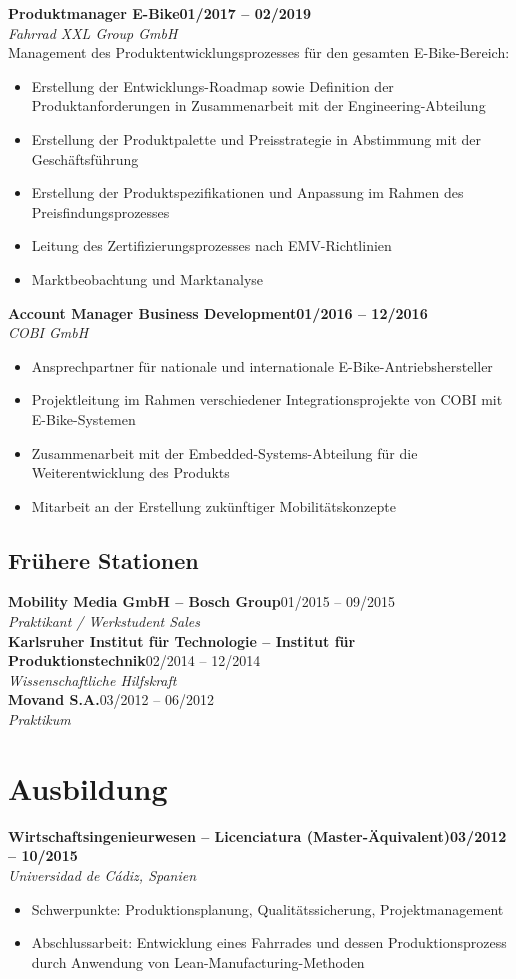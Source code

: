 \documentclass[10.5pt,a4paper]{article}
\newcommand{\cventry}[4]{%
  \needspace{6\baselineskip}%
  \noindent\textbf{\large #2}\hfill{\color{gray}\textbf{\small #1}}\\[1pt]
  {\color{accent}\textit{#3}}\\[3pt]
  #4
  \vspace{5pt}
}
\newcommand{\cvcompact}[3]{%
  \noindent\textbf{#2}\hfill{\color{gray}\small #1}\\[1pt]
  {\small\color{gray}\textit{#3}}\\[4pt]
}
\newcommand{\cvedu}[4]{%
  \needspace{6\baselineskip}%
  \noindent\textbf{\large #2}\hfill{\color{gray}\textbf{\small #1}}\\[1pt]
  {\color{accent}\textit{#3}}\\[3pt]
  #4
  \vspace{7pt}
}
\newenvironment{tightitemize}{
  \begin{itemize}[leftmargin=12pt,itemsep=1pt,topsep=2pt,parsep=0pt,label={\color{accent}\textbullet}]
}{\end{itemize}}
\begin{document}
\cventry{01/2017 -- 02/2019}{Produktmanager E-Bike}{Fahrrad XXL Group GmbH}{
Management des Produktentwicklungsprozesses für den gesamten E-Bike-Bereich:
\begin{tightitemize}
  \item Erstellung der Entwicklungs-Roadmap sowie Definition der Produktanforderungen in Zusammenarbeit mit der Engineering-Abteilung
  \item Erstellung der Produktpalette und Preisstrategie in Abstimmung mit der Geschäftsführung
  \item Erstellung der Produktspezifikationen und Anpassung im Rahmen des Preisfindungsprozesses
  \item Leitung des Zertifizierungsprozesses nach EMV-Richtlinien
  \item Marktbeobachtung und Marktanalyse
\end{tightitemize}
}

\cventry{01/2016 -- 12/2016}{Account Manager Business Development}{COBI GmbH}{
\begin{tightitemize}
  \item Ansprechpartner für nationale und internationale E-Bike-Antriebshersteller
  \item Projektleitung im Rahmen verschiedener Integrationsprojekte von COBI mit E-Bike-Systemen
  \item Zusammenarbeit mit der Embedded-Systems-Abteilung für die Weiterentwicklung des Produkts
  \item Mitarbeit an der Erstellung zukünftiger Mobilitätskonzepte
\end{tightitemize}
}

\subsection*{Frühere Stationen}
\cvcompact{01/2015 -- 09/2015}{Mobility Media GmbH -- Bosch Group}{Praktikant / Werkstudent Sales}
\cvcompact{02/2014 -- 12/2014}{Karlsruher Institut für Technologie -- Institut für Produktionstechnik}{Wissenschaftliche Hilfskraft}
\cvcompact{03/2012 -- 06/2012}{Movand S.A.}{Praktikum}

\section*{Ausbildung}

\cvedu{03/2012 -- 10/2015}{Wirtschaftsingenieurwesen -- Licenciatura (Master-Äquivalent)}{Universidad de Cádiz, Spanien}{
\begin{tightitemize}
  \item Schwerpunkte: Produktionsplanung, Qualitätssicherung, Projektmanagement
  \item Abschlussarbeit: Entwicklung eines Fahrrades und dessen Produktionsprozess durch Anwendung von Lean-Manufacturing-Methoden
\end{tightitemize}
}
\end{document}
